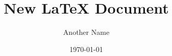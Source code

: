 \documentclass{article}
\begin{document}
\title{New LaTeX Document}
\author{Another Name}
\date{\today}

\maketitle








\end{document}
